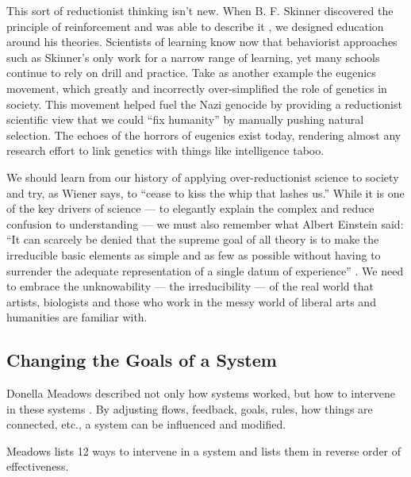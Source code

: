This sort of reductionist thinking isn't new. When B. F. Skinner discovered the principle of reinforcement and was able to describe it \cite{skinner1938behavior}, we designed education around his theories. Scientists of learning know now that behaviorist approaches such as Skinner's only work for a narrow range of learning, yet many schools continue to rely on drill and practice. Take as another example the eugenics movement, which greatly and incorrectly over-simplified the role of genetics in society. This movement helped fuel the Nazi genocide by providing a reductionist scientific view that we could ``fix humanity'' by manually pushing natural selection. The echoes of the horrors of eugenics exist today, rendering almost any research effort to link genetics with things like intelligence taboo.

We should learn from our history of applying over-reductionist science to society and try, as Wiener says, to ``cease to kiss the whip that lashes us.'' While it is one of the key drivers of science --- to elegantly explain the complex and reduce confusion to understanding --- we must also remember what Albert Einstein said: ``It can scarcely be denied that the supreme goal of all theory is to make the irreducible basic elements as simple and as few as possible without having to surrender the adequate representation of a single datum of experience'' \cite{einstein1934method}. We need to embrace the unknowability --- the irreducibility --- of the real world that artists, biologists and those who work in the messy world of liberal arts and humanities are familiar with.

\subsection{Changing the Goals of a System}

\label{sec:meadows}

Donella Meadows described not only how systems worked, but how to intervene in these systems \cite{meadows_leverage}. By adjusting flows, feedback, goals, rules, how things are connected, etc., a system can be influenced and modified.

Meadows lists 12 ways to intervene in a system and lists them in reverse order of effectiveness.

